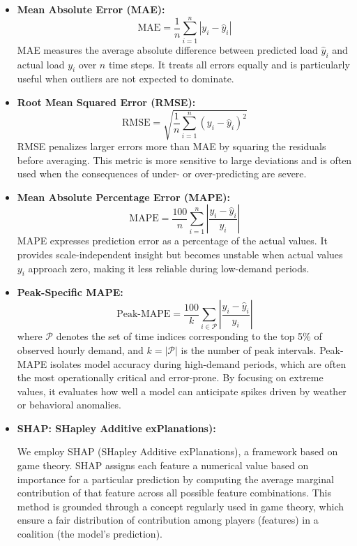 \documentclass{ifacconf}
\begin{document}
\begin{itemize}

    \item \textbf{Mean Absolute Error (MAE):}
    \[
    \text{MAE} = \frac{1}{n} \sum_{i=1}^{n} \left| y_i - \hat{y}_i \right|
    \]
    MAE measures the average absolute difference between predicted load $\hat{y}_i$ and actual load $y_i$ over $n$ time steps. It treats all errors equally and is particularly useful when outliers are not expected to dominate.

    \item \textbf{Root Mean Squared Error (RMSE):}
    \[
    \text{RMSE} = \sqrt{ \frac{1}{n} \sum_{i=1}^{n} \left( y_i - \hat{y}_i \right)^2 }
    \]
    RMSE penalizes larger errors more than MAE by squaring the residuals before averaging. This metric is more sensitive to large deviations and is often used when the consequences of under- or over-predicting are severe.

    \item \textbf{Mean Absolute Percentage Error (MAPE):}
    \[
    \text{MAPE} = \frac{100}{n} \sum_{i=1}^{n} \left| \frac{y_i - \hat{y}_i}{y_i} \right|
    \]
    MAPE expresses prediction error as a percentage of the actual values. It provides scale-independent insight but becomes unstable when actual values $y_i$ approach zero, making it less reliable during low-demand periods.

    \item \textbf{Peak-Specific MAPE:}
    \[
    \text{Peak-MAPE} = \frac{100}{k} \sum_{i \in \mathcal{P}} \left| \frac{y_i - \hat{y}_i}{y_i} \right|
    \]
    where $\mathcal{P}$ denotes the set of time indices corresponding to the top 5\% of observed hourly demand, and $k = |\mathcal{P}|$ is the number of peak intervals. Peak-MAPE isolates model accuracy during high-demand periods, which are often the most operationally critical and error-prone. By focusing on extreme values, it evaluates how well a model can anticipate spikes driven by weather or behavioral anomalies.
    \item \textbf{SHAP: SHapley Additive exPlanations):}

We employ SHAP (SHapley Additive exPlanations), a framework based on  game theory. SHAP assigns each feature a numerical value based on importance for a particular prediction by computing the average marginal contribution of that feature across all possible feature combinations. This method is grounded through a concept regularly used  in game theory, which ensure a fair distribution of contribution among players (features) in a coalition (the model's prediction).


\end{itemize}
\end{document}

